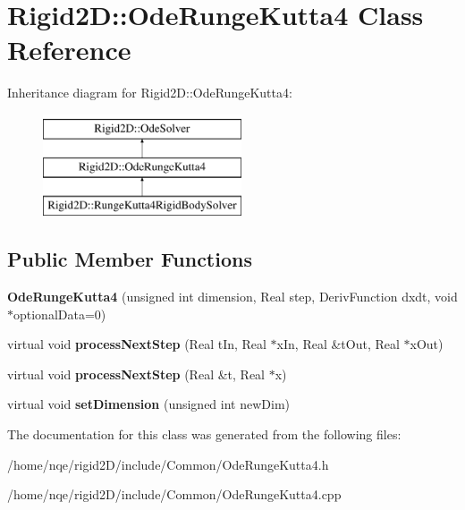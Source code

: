 \hypertarget{class_rigid2_d_1_1_ode_runge_kutta4}{
\section{Rigid2D::OdeRungeKutta4 Class Reference}
\label{class_rigid2_d_1_1_ode_runge_kutta4}
}
Inheritance diagram for Rigid2D::OdeRungeKutta4:\begin{figure}[H]
\begin{center}
\leavevmode
\includegraphics[height=3cm]{class_rigid2_d_1_1_ode_runge_kutta4}
\end{center}
\end{figure}
\subsection*{Public Member Functions}
\begin{DoxyCompactItemize}
\item 
\hypertarget{class_rigid2_d_1_1_ode_runge_kutta4_a6ef81bf2fcca232c09dcdb338e70d45b}{
{\bfseries OdeRungeKutta4} (unsigned int dimension, Real step, DerivFunction dxdt, void $\ast$optionalData=0)}
\label{class_rigid2_d_1_1_ode_runge_kutta4_a6ef81bf2fcca232c09dcdb338e70d45b}

\item 
\hypertarget{class_rigid2_d_1_1_ode_runge_kutta4_a0a45a2b9ad6c0815f3176f5e47735e10}{
virtual void {\bfseries processNextStep} (Real tIn, Real $\ast$xIn, Real \&tOut, Real $\ast$xOut)}
\label{class_rigid2_d_1_1_ode_runge_kutta4_a0a45a2b9ad6c0815f3176f5e47735e10}

\item 
\hypertarget{class_rigid2_d_1_1_ode_runge_kutta4_a35d14b59638a7ab0c1ebc6f2e166e300}{
virtual void {\bfseries processNextStep} (Real \&t, Real $\ast$x)}
\label{class_rigid2_d_1_1_ode_runge_kutta4_a35d14b59638a7ab0c1ebc6f2e166e300}

\item 
\hypertarget{class_rigid2_d_1_1_ode_runge_kutta4_a8c5bd3935471b3c59f790cf32c353b1f}{
virtual void {\bfseries setDimension} (unsigned int newDim)}
\label{class_rigid2_d_1_1_ode_runge_kutta4_a8c5bd3935471b3c59f790cf32c353b1f}

\end{DoxyCompactItemize}


The documentation for this class was generated from the following files:\begin{DoxyCompactItemize}
\item 
/home/nqe/rigid2D/include/Common/OdeRungeKutta4.h\item 
/home/nqe/rigid2D/include/Common/OdeRungeKutta4.cpp\end{DoxyCompactItemize}
